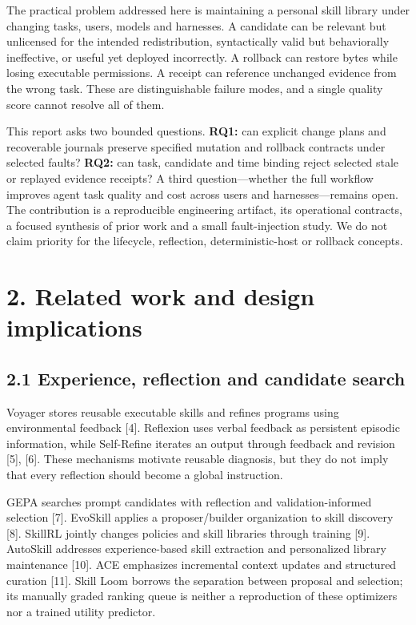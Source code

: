 \documentclass[
  11pt,
]{article}
\begin{document}
The practical problem addressed here is maintaining a personal skill
library under changing tasks, users, models and harnesses. A candidate
can be relevant but unlicensed for the intended redistribution,
syntactically valid but behaviorally ineffective, or useful yet deployed
incorrectly. A rollback can restore bytes while losing executable
permissions. A receipt can reference unchanged evidence from the wrong
task. These are distinguishable failure modes, and a single quality
score cannot resolve all of them.

This report asks two bounded questions. \textbf{RQ1:} can explicit
change plans and recoverable journals preserve specified mutation and
rollback contracts under selected faults? \textbf{RQ2:} can task,
candidate and time binding reject selected stale or replayed evidence
receipts? A third question---whether the full workflow improves agent
task quality and cost across users and harnesses---remains open. The
contribution is a reproducible engineering artifact, its operational
contracts, a focused synthesis of prior work and a small fault-injection
study. We do not claim priority for the lifecycle, reflection,
deterministic-host or rollback concepts.

\section{2. Related work and design
implications}\label{related-work-and-design-implications}

\subsection{2.1 Experience, reflection and candidate
search}\label{experience-reflection-and-candidate-search}

Voyager stores reusable executable skills and refines programs using
environmental feedback {[}4{]}. Reflexion uses verbal feedback as
persistent episodic information, while Self-Refine iterates an output
through feedback and revision {[}5{]}, {[}6{]}. These mechanisms
motivate reusable diagnosis, but they do not imply that every reflection
should become a global instruction.

GEPA searches prompt candidates with reflection and validation-informed
selection {[}7{]}. EvoSkill applies a proposer/builder organization to
skill discovery {[}8{]}. SkillRL jointly changes policies and skill
libraries through training {[}9{]}. AutoSkill addresses experience-based
skill extraction and personalized library maintenance {[}10{]}. ACE
emphasizes incremental context updates and structured curation {[}11{]}.
Skill Loom borrows the separation between proposal and selection; its
manually graded ranking queue is neither a reproduction of these
optimizers nor a trained utility predictor.
\end{document}
